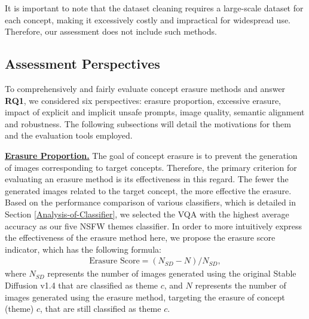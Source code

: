 
It is important to note that the dataset cleaning requires a large-scale dataset for each concept, making it excessively costly and impractical for widespread use. Therefore, our assessment does not include such methods.



\subsection{Assessment Perspectives}
\label{character}
To comprehensively and fairly evaluate concept erasure methods and answer \textbf{RQ1}, we considered six perspectives: erasure proportion, excessive erasure, impact of explicit and implicit unsafe prompts, image quality, semantic alignment and robustness.  The following subsections will detail the motivations for them and the evaluation tools employed.  

 \noindent \textbf{\uline{Erasure Proportion.}} 
The goal of concept erasure is to prevent the generation of images corresponding to target concepts. Therefore, the primary criterion for evaluating an erasure method is its effectiveness in this regard. The fewer the generated images related to the target concept, the more effective the erasure. Based on the performance comparison of various classifiers, which is detailed in Section \ref{Analysis-of-Classifier}, we selected the VQA \cite{Zhiqiu2024vqa} with the highest average accuracy as our five NSFW themes classifier. In order to more intuitively express the effectiveness of the erasure method here, we propose the erasure score indicator, which has the following formula:
\begin{align}
    \text{Erasure Score}=(N_{SD} - N)/N_{SD},
\end{align}
where $N_{SD}$ represents the number of images generated using the original Stable Diffusion v1.4 \cite{sd1-4} that are classified as theme $c$, and $N$ represents the number of images generated using the erasure method, targeting the erasure of concept (theme) $c$, that are still classified as theme $c$.  
 
